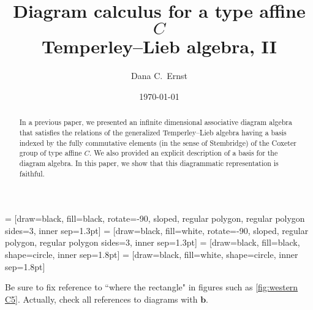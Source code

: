 \documentclass[11pt]{amsart}
\date{\today}
\theoremstyle{definition}
\numberwithin{equation}{section}
\renewcommand{\(}{\left(}
\renewcommand{\)}{\right)}
\begin{document}
 = [draw=black, fill=black, rotate=-90, sloped, regular polygon, regular polygon sides=3, inner sep=1.3pt]
 = [draw=black, fill=white, rotate=-90, sloped, regular polygon, regular polygon sides=3, inner sep=1.3pt]
 = [draw=black, fill=black, shape=circle, inner sep=1.8pt]
 = [draw=black, fill=white, shape=circle, inner sep=1.8pt]

\title[Diagram calculus for a type affine $C$ Temperley--Lieb algebra, II]{Diagram calculus for a type affine $C$ \\ Temperley--Lieb algebra, II}

\author[D.C.~Ernst]{Dana C.~Ernst}
\address{Department of Mathematics and Statistics, Northern Arizona University, Flagstaff, AZ 86011}



\begin{abstract}
In a previous paper, we presented an infinite dimensional associative diagram algebra that satisfies the relations of the generalized Temperley--Lieb algebra having a basis indexed by the fully commutative elements (in the sense of Stembridge) of the Coxeter group of type affine $C$.  We also provided an explicit description of a basis for the diagram algebra.  In this paper, we show that this diagrammatic representation is faithful.
\end{abstract}

\maketitle



{\color{red}Be sure to fix reference to ``where the rectangle" in figures such as \ref{fig:western C5}. Actually, check all references to diagrams with $\mathbf{b}$.}

\end{document}
